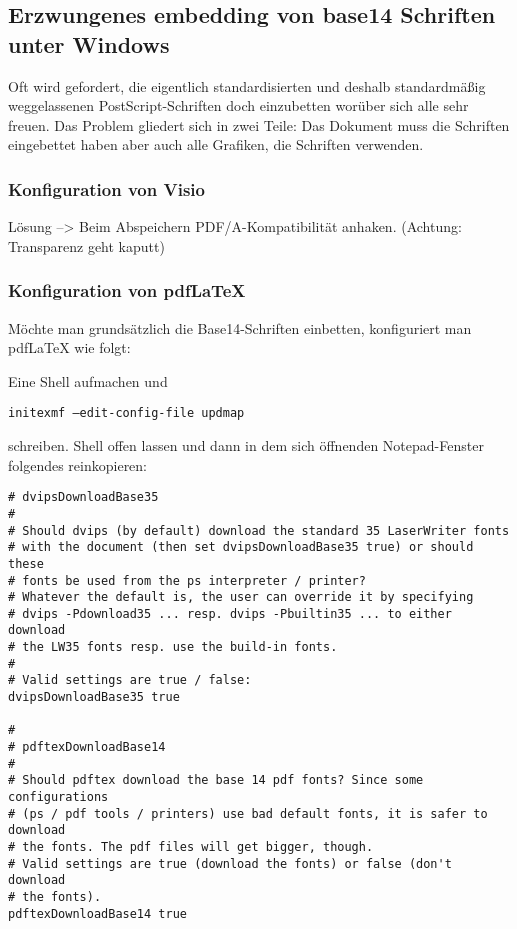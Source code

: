 \subsection{Erzwungenes embedding von base14 Schriften unter Windows}
Oft wird gefordert, die eigentlich standardisierten und deshalb standardmäßig weggelassenen PostScript-Schriften doch einzubetten worüber sich alle sehr freuen.
Das Problem gliedert sich in zwei Teile: Das Dokument muss die Schriften eingebettet haben aber auch alle Grafiken, die Schriften verwenden.

\subsubsection{Konfiguration von Visio}
Lösung --> Beim Abspeichern PDF/A-Kompatibilität anhaken. (Achtung: Transparenz geht kaputt)

\subsubsection{Konfiguration von pdfLaTeX}

Möchte man grundsätzlich die Base14-Schriften einbetten, konfiguriert man pdfLaTeX wie folgt:

Eine Shell aufmachen und

\texttt{initexmf --edit-config-file updmap}

schreiben.
Shell offen lassen und dann in dem sich öffnenden Notepad-Fenster folgendes reinkopieren:

{\scriptsize
\begin{verbatim}
# dvipsDownloadBase35
#
# Should dvips (by default) download the standard 35 LaserWriter fonts
# with the document (then set dvipsDownloadBase35 true) or should these
# fonts be used from the ps interpreter / printer?
# Whatever the default is, the user can override it by specifying
# dvips -Pdownload35 ... resp. dvips -Pbuiltin35 ... to either download
# the LW35 fonts resp. use the build-in fonts.
#
# Valid settings are true / false:
dvipsDownloadBase35 true

#
# pdftexDownloadBase14
#
# Should pdftex download the base 14 pdf fonts? Since some configurations
# (ps / pdf tools / printers) use bad default fonts, it is safer to download
# the fonts. The pdf files will get bigger, though.
# Valid settings are true (download the fonts) or false (don't download
# the fonts).
pdftexDownloadBase14 true
\end{verbatim}
}

